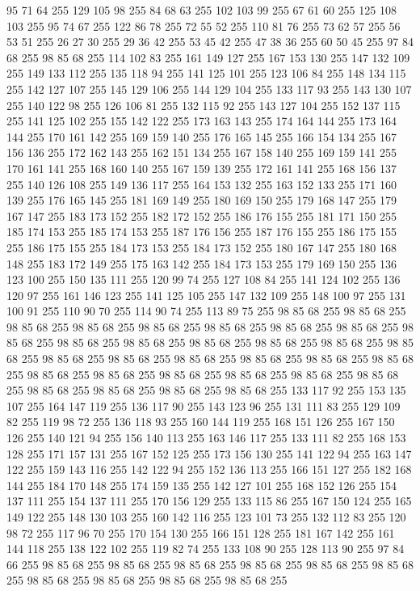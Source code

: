 95 71 64 255 129 105 98 255 84 68 63 255 102 103 99 255 67 61 60 255 125 108 103 255 95 74 67 255 122 86 78 255 72 55 52 255 110 81 76 255 73 62 57 255 56 53 51 255 26 27 30 255 29 36 42 255 53 45 42 255 47 38 36 255 60 50 45 255 97 84 68 255 98 85 68 255 114 102 83 255 161 149 127 255 167 153 130 255 147 132 109 255 149 133 112 255 135 118 94 255 141 125 101 255 123 106 84 255 148 134 115 255 142 127 107 255 145 129 106 255 144 129 104 255 133 117 93 255 143 130 107 255 140 122 98 255 126 106 81 255 132 115 92 255 143 127 104 255 152 137 115 255 141 125 102 255 155 142 122 255 173 163 143 255 174 164 144 255 173 164 144 255 170 161 142 255 169 159 140 255 176 165 145 255 166 154 134 255 167 156 136 255 172 162 143 255 162 151 134 255 167 158 140 255 169 159 141 255 170 161 141 255 168 160 140 255 167 159 139 255 172 161 141 255 168 156 137 255 140 126 108 255 149 136 117 255 164 153 132 255 163 152 133 255 171 160 139 255 176 165 145 255 181 169 149 255
180 169 150 255 179 168 147 255 179 167 147 255 183 173 152 255 182 172 152 255 186 176 155 255 181 171 150 255 185 174 153 255 185 174 153 255 187 176 156 255 187 176 155 255 186 175 155 255 186 175 155 255 184 173 153 255 184 173 152 255 180 167 147 255 180 168 148 255 183 172 149 255 175 163 142 255 184 173 153 255 179 169 150 255 136 123 100 255 150 135 111 255 120 99 74 255 127 108 84 255 141 124 102 255 136 120 97 255 161 146 123 255 141 125 105 255 147 132 109 255 148 100 97 255 131 100 91 255 110 90 70 255 114 90 74 255 113 89 75 255 98 85 68 255 98 85 68 255 98 85 68 255 98 85 68 255 98 85 68 255 98 85 68 255 98 85 68 255 98 85 68 255 98 85 68 255 98 85 68 255 98 85 68 255 98 85 68 255 98 85 68 255 98 85 68 255 98 85 68 255 98 85 68 255 98 85 68 255 98 85 68 255 98 85 68 255 98 85 68 255 98 85 68 255 98 85 68 255 98 85 68 255 98 85 68 255 98 85 68 255 98 85 68 255 98 85 68 255 98 85 68 255 98 85 68 255
98 85 68 255 98 85 68 255 133 117 92 255 153 135 107 255 164 147 119 255 136 117 90 255 143 123 96 255 131 111 83 255 129 109 82 255 119 98 72 255 136 118 93 255 160 144 119 255 168 151 126 255 167 150 126 255 140 121 94 255 156 140 113 255 163 146 117 255 133 111 82 255 168 153 128 255 171 157 131 255 167 152 125 255 173 156 130 255 141 122 94 255 163 147 122 255 159 143 116 255 142 122 94 255 152 136 113 255 166 151 127 255 182 168 144 255 184 170 148 255 174 159 135 255 142 127 101 255 168 152 126 255 154 137 111 255 154 137 111 255 170 156 129 255 133 115 86 255 167 150 124 255 165 149 122 255 148 130 103 255 160 142 116 255 123 101 73 255 132 112 83 255 120 98 72 255 117 96 70 255 170 154 130 255 166 151 128 255 181 167 142 255 161 144 118 255 138 122 102 255 119 82 74 255 133 108 90 255 128 113 90 255 97 84 66 255 98 85 68 255 98 85 68 255 98 85 68 255 98 85 68 255 98 85 68 255 98 85 68 255 98 85 68 255 98 85 68 255 98 85 68 255 98 85 68 255

